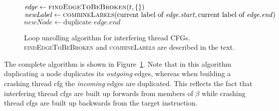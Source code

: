 \begin{figure}
\begin{algorithmic}
       \State $\mathit{edge} \gets \textsc{findEdgeToBeBroken}(t, \{\})$
       \State $\mathit{newLabel} \gets \textsc{combineLabels}(\text{current label of } \mathit{edge}.\mathit{start}, \text{current label of } \mathit{edge}.\mathit{end})$
       \Else
           \State $\mathit{newNode} \gets \text{duplicate } \mathit{edge}.\mathit{end}$
           \EndFor
       \EndIf
    \EndWhile
  \EndFor
\end{algorithmic}
\vspace{-6pt}
\caption{Loop unrolling algorithm for interfering thread CFGs.
  \textsc{findEdgeToBeBroken} and \textsc{combineLabels} are described
  in the text.}
\label{fig:derive:store_cfg_unroll_alg}
\end{figure}

The complete algorithm is shown in
Figure~\ref{fig:derive:store_cfg_unroll_alg}.  Note that in this
algorithm duplicating a node duplicates its \emph{outgoing} edges,
whereas when building a crashing thread \gls{cfg} the \emph{incoming}
edges are duplicated.  This reflects the fact that interfering thread
\glspl{cfg} are built up forwards from members of $\beta$ while
crashing thread \glspl{cfg} are built up backwards from the target
instruction.

